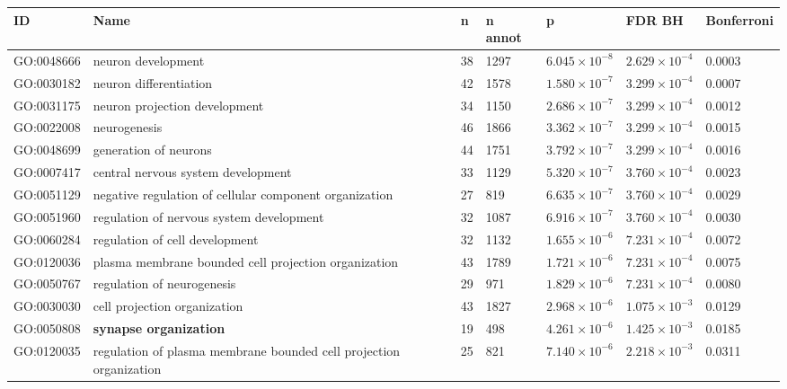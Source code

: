 \begin{table}[ht]
\centering
 \setlength{\extrarowheight}{2pt}
\begin{adjustbox}{width=\textwidth}

\begin{tabular}{lllllll}
  \toprule
ID & Name & n & n annot & p & FDR BH & Bonferroni \\ 
  \midrule
GO:0048666 & neuron development & 38 & 1297 & $6.045 \times 10^{-8}$ & $2.629 \times 10^{-4}$ & 0.0003 \\ 
  GO:0030182 & neuron differentiation & 42 & 1578 & $1.580 \times 10^{-7}$ & $3.299 \times 10^{-4}$ & 0.0007 \\ 
  GO:0031175 & neuron projection development & 34 & 1150 & $2.686 \times 10^{-7}$ & $3.299 \times 10^{-4}$ & 0.0012 \\ 
  GO:0022008 & neurogenesis & 46 & 1866 & $3.362 \times 10^{-7}$ & $3.299 \times 10^{-4}$ & 0.0015 \\ 
  GO:0048699 & generation of neurons & 44 & 1751 & $3.792 \times 10^{-7}$ & $3.299 \times 10^{-4}$ & 0.0016 \\ 
  GO:0007417 & central nervous system development & 33 & 1129 & $5.320 \times 10^{-7}$ & $3.760 \times 10^{-4}$ & 0.0023 \\ 
  GO:0051129 & negative regulation of cellular component organization & 27 & 819 & $6.635 \times 10^{-7}$ & $3.760 \times 10^{-4}$ & 0.0029 \\ 
  GO:0051960 & regulation of nervous system development & 32 & 1087 & $6.916 \times 10^{-7}$ & $3.760 \times 10^{-4}$ & 0.0030 \\ 
  GO:0060284 & regulation of cell development & 32 & 1132 & $1.655 \times 10^{-6}$ & $7.231 \times 10^{-4}$ & 0.0072 \\ 
  GO:0120036 & plasma membrane bounded cell projection organization & 43 & 1789 & $1.721 \times 10^{-6}$ & $7.231 \times 10^{-4}$ & 0.0075 \\ 
  GO:0050767 & regulation of neurogenesis & 29 & 971 & $1.829 \times 10^{-6}$ & $7.231 \times 10^{-4}$ & 0.0080 \\ 
  GO:0030030 & cell projection organization & 43 & 1827 & $2.968 \times 10^{-6}$ & $1.075 \times 10^{-3}$ & 0.0129 \\ 
  GO:0050808 & \textbf{synapse organization} & 19 & 498 & $4.261 \times 10^{-6}$ & $1.425 \times 10^{-3}$ & 0.0185 \\ 
  GO:0120035 & regulation of plasma membrane bounded cell projection organization & 25 & 821 & $7.140 \times 10^{-6}$ & $2.218 \times 10^{-3}$ & 0.0311 \\ 

\end{tabular}
\end{adjustbox}
\end{table}
